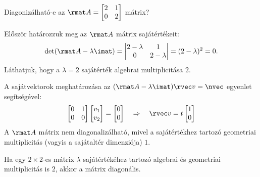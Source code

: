 \documentclass[a4paper, 12pt]{scrartcl}
\begin{document}
\begin{example}
  Diagonizálható-e az $\rmat A = \begin{bmatrix} 2 & 1 \\ 0 & 2\end{bmatrix}$
  mátrix?

  Először határozzuk meg az $\rmat A$ mátrix sajátértékeit:
  $$
    \det(\rmat A - \lambda \imat) = \begin{vmatrix}
      2 - \lambda & 1           \\
      0           & 2 - \lambda
    \end{vmatrix} = (2 - \lambda)^2 = 0
    \text.
  $$
  Láthatjuk, hogy a $\lambda = 2$ sajátérték algebrai multiplicitása $2$.

  A sajátvektorok meghatározása az $(\rmat A - \lambda \imat) \rvec v = \nvec$
  egyenlet segítségével:
  $$
    \begin{bmatrix}
      0 & 1 \\
      0 & 0
    \end{bmatrix}
    \begin{bmatrix}
      v_1 \\
      v_2
    \end{bmatrix}
    =
    \begin{bmatrix}
      0 \\
      0
    \end{bmatrix}
    \quad \Rightarrow \quad
    \rvec v = t \begin{bmatrix}
      1 \\
      0
    \end{bmatrix}
  $$
  A $\rmat A$ mátrix nem diagonalizálható, mivel a sajátértékhez tartozó
  geometriai multiplicitás (vagyis a sajátaltér dimenziója) $1$.
\end{example}

\begin{note}
  Ha egy $2 \times 2$-es mátrix $\lambda$ sajátértékéhez tartozó algebrai és
  geometriai multiplicitás is $2$, akkor a mátrix diagonális.
\end{note}
\end{document}

